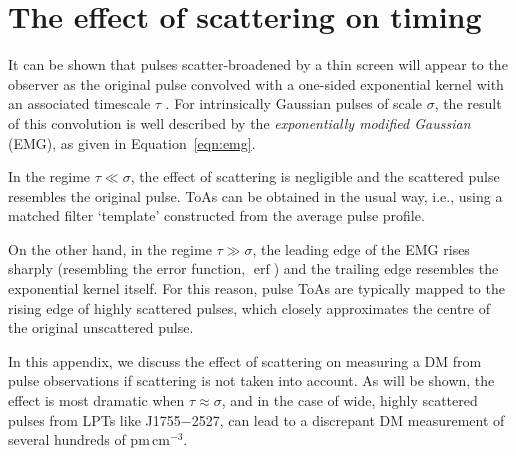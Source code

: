 \documentclass[fleqn,usenatbib]{mnras}
\newcommand{\src}{J1755$-$2527}
\DeclareMathOperator{\erf}{erf}
\newcommand{\Eqn}{Equation}
\begin{document}


\appendix

\section{The effect of scattering on timing}
\label{app:scattering_dm}

It can be shown that pulses scatter-broadened by a thin screen will appear to the observer as the original pulse convolved with a one-sided exponential kernel with an associated timescale $\tau$ \citep{1972MNRAS.157...55W,1973MNRAS.163..345W}.
For intrinsically Gaussian pulses of scale $\sigma$, the result of this convolution is well described by the \textit{exponentially modified Gaussian} (EMG), as given in \Eqn~\ref{eqn:emg}.

In the regime $\tau \ll \sigma$, the effect of scattering is negligible and the scattered pulse resembles the original pulse.
ToAs can be obtained in the usual way, i.e., using a matched filter `template' constructed from the average pulse profile.

On the other hand, in the regime $\tau \gg \sigma$, the leading edge of the EMG rises sharply (resembling the error function, $\erf$) and the trailing edge resembles the exponential kernel itself.
For this reason, pulse ToAs are typically mapped to the rising edge of highly scattered pulses, which closely approximates the centre of the original unscattered pulse.

In this appendix, we discuss the effect of scattering on measuring a DM from pulse observations if scattering is not taken into account.
As will be shown, the effect is most dramatic when $\tau \approx \sigma$, and in the case of wide, highly scattered pulses from LPTs like \src{}, can lead to a discrepant DM measurement of several hundreds of pm\,cm$^{-3}$.
\end{document}
